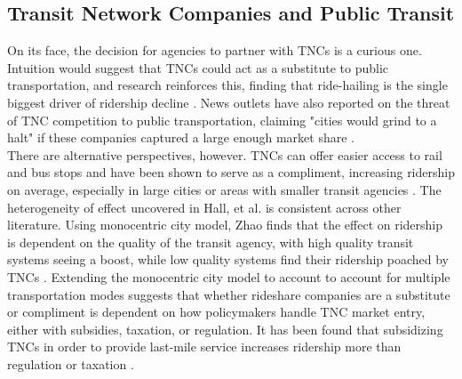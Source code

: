 \documentclass [12pt]{report}
\begin{document}
\subsection*{Transit Network Companies and Public Transit}
On its face, the decision for agencies to partner with TNCs is a curious one. Intuition would suggest that TNCs could act as a substitute to public transportation, and research reinforces this, finding that ride-hailing is the single biggest driver of ridership decline \parencite{erhardt22}. News outlets have also reported on the threat of TNC competition to public transportation, claiming "cities would grind to a halt" if these companies captured a large enough market share \parencite{mcfarlandcnn}.\\
\indent There are alternative perspectives, however. TNCs can offer easier access to rail and bus stops and have been shown to serve as a compliment, increasing ridership on average, especially in large cities or areas with smaller transit agencies \parencite{Hall2018}. The heterogeneity of effect uncovered in Hall, et al. is consistent across other literature. Using monocentric city model, Zhao finds that the effect on ridership is dependent on the quality of the transit agency, with high quality transit systems seeing a boost, while low quality systems find their ridership poached by TNCs \parencite{zhao19}. Extending the monocentric city model to account to account for multiple transportation modes suggests that whether rideshare companies are a substitute or compliment is dependent on how policymakers handle TNC market entry, either with subsidies, taxation, or regulation. It has been found that subsidizing TNCs in order to provide last-mile service increases ridership more than regulation or taxation \parencite{agrawal23}.\\

\end{document}

